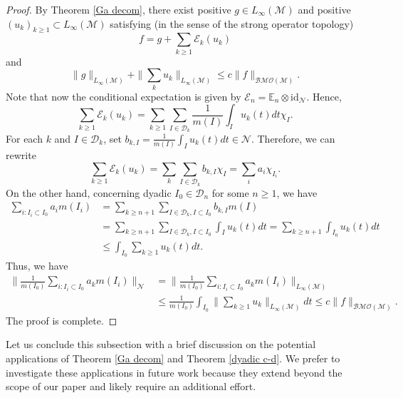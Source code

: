 \documentclass[11]{amsart}
\numberwithin{equation}{section}
\newcommand{\M}{\mathcal{M}}
\begin{document}
\begin{proof}
	By Theorem \ref{Ga decom}, there
	exist positive $g\in L_{\infty}(\mathcal{M})$ and positive $(u_k)_{k\geq1}\subset L_{\infty}(\mathcal{M})$ satisfying (in the sense of the strong operator topology)
	$$f=g+\sum_{k\geq1}\mathcal{E}_k(u_k)$$
	and 
	$$\|g\|_{L_{\infty}(\mathcal{M})}+\|\sum_ku_k\|_{L_{\infty}(\mathcal{M})}\leq  c \|f\|_{\mathcal{BMO}(\mathcal{M})}.$$
	Note that now the conditional expectation is given by $\mathcal{E}_n=\mathbb{E}_n\otimes \mathrm{id}_{\mathcal{N}}$. Hence,
	$$\sum_{k\geq1}\mathcal{E}_k(u_k)=\sum_{k\geq1} \sum_{I\in \mathcal{D}_k}\frac{1}{m(I)}\int_I u_k(t)dt \chi_I.$$
For each $k$ and $I\in \mathcal{D}_k$, set $b_{k,I}=\frac{1}{m(I)}\int_I u_k(t)dt\in \mathcal{N}$. Therefore, we can rewrite 
$$\sum_{k\geq1}\mathcal{E}_k(u_k)=\sum_k\sum_{I\in \mathcal{D}_k} b_{k,I} \chi_{I} =\sum_i a_i\chi_{I_i}.$$
On the other hand, concerning dyadic $I_0\in \mathcal{D}_n$ for some $n\geq 1$, we have 
\begin{align*}
	\sum_{i:I_i\subset I_0} a_i m(I_i)&=\sum_{k\geq n+1}\sum_{I\in \mathcal{D}_k,I\subset I_0} b_{k,I}m(I)\\
	&=\sum_{k\geq n+1}\sum_{I\in \mathcal{D}_k,I\subset I_0} \int_I u_k(t)dt=\sum_{k\geq n+1}\int_{I_0}u_k(t)dt\\
	&\leq \int_{I_0} \sum_{k\geq1}u_k(t)dt.
\end{align*}
Thus, we have
	\begin{align*}
\Big\|\frac{1}{m(I_0)}\sum_{i:I_i\subset I_0}a_k m(I_i)\Big\|_{\mathcal{N}}&=\Big\|\frac{1}{m(I_0)}\sum_{i:I_i\subset I_0}a_k m(I_i)\Big\|_{L_{\infty}(\M)}\\
&\leq \frac{1}{m(I_0)}\int_{I_0} \|\sum_{k\geq1}u_k\|_{L_{\infty}(\M)}dt\leq c\|f\|_{\mathcal{BMO}(\mathcal{M})}.
	\end{align*}
The proof is complete. 
\end{proof}


Let us conclude this subsection with a brief discussion on the potential applications of Theorem \ref{Ga decom} and Theorem \ref{dyadic c-d}.
We prefer to investigate these applications in future work because they extend beyond the scope of our paper and likely require an additional effort.
\end{document}
